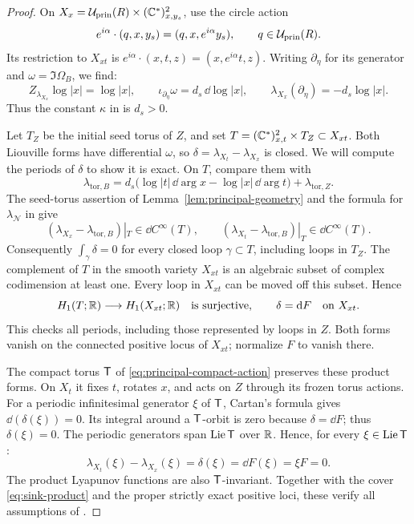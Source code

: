 \documentclass[12pt, letter]{amsart}
\theoremstyle{definition}
\newcommand{\Nn}{\mathcal N}
\newcommand{\pr}{\mathrm{prin}}
\numberwithin{equation}{section}
\begin{document}
\begin{proof}
On $X_x=\cU_{\pr}(R)\times(\C^*)^2_{x,y_s}$, use the circle action
\[
 e^{i\alpha}\cdot(q,x,y_s)=(q,x,e^{i\alpha}y_s),
 \qquad q\in\cU_{\pr}(R).
\]
Its restriction to $X_{xt}$ is
$e^{i\alpha}\cdot(x,t,z)=(x,e^{i\alpha}t,z)$.
Writing $\partial_\eta$ for its generator and
$\omega=\Im\Omega_B$, we find:
\[
 Z_{\lambda_{X_x}}\log|x|=\log|x|,\qquad
 \iota_{\partial_\eta}\omega=d_s\,\dd\log|x|,\qquad
 \lambda_{X_x}(\partial_\eta)=-d_s\log|x|.
\]
Thus the constant $\kappa$ in \cite[Setup~4.8]{HS} is $d_s>0$.



Let $T_Z$ be the initial seed torus of $Z$, and set
$T=(\mathbb C^*)^2_{x,t}\times T_Z\subset X_{xt}$.
Both Liouville forms have differential $\omega$, so
$\delta=\lambda_{X_t}-\lambda_{X_x}$ is closed.  We will compute the periods of $\delta$ to show it is exact.
On $T$, compare them with
\[
 \lambda_{\mathrm{tor},B}
 =d_s\bigl(\log|t|\,\dd\arg x-\log|x|\,\dd\arg t\bigr)
       +\lambda_{\mathrm{tor},Z}.
\] 
The seed-torus assertion of Lemma~\ref{lem:principal-geometry}
and the formula for $\lambda_{\Nn}$ in \cite[Section~4.2]{HS}
give
\[
 (\lambda_{X_x}-\lambda_{\mathrm{tor},B})|_T\in\dd C^\infty(T),
 \qquad
 (\lambda_{X_t}-\lambda_{\mathrm{tor},B})|_T\in\dd C^\infty(T).
\]
Consequently $\int_\gamma\delta=0$ for every closed loop
$\gamma\subset T$, including loops in $T_Z$.
The complement of $T$ in the smooth variety $X_{xt}$ is an
algebraic subset of complex codimension at least one.
Every loop in $X_{xt}$ can be moved off this
subset. Hence
\[
 H_1(T;\mathbb R)\longrightarrow H_1(X_{xt};\mathbb R)
 \quad\text{is surjective},\qquad
 \delta=\mathrm{d} F\quad\text{on }X_{xt}.
\]
This checks all periods, including those represented by loops in $Z$.
Both forms vanish on the connected positive locus of $X_{xt}$;
normalize $F$ to vanish there.

The compact torus $\mathsf T$ of \eqref{eq:principal-compact-action}
preserves these product forms. On $X_t$ it fixes $t$, rotates
$x$, and acts on $Z$ through its frozen torus actions.
For a periodic infinitesimal generator $\xi$ of $\mathsf T$,
Cartan's formula gives $\dd(\delta(\xi))=0$.
Its integral around a $\mathsf T$-orbit is zero because $\delta=\dd F$;
thus $\delta(\xi)=0$.
The periodic generators span $\operatorname{Lie}\mathsf T$ over $\mathbb R$.
Hence, for every $\xi\in\operatorname{Lie}\mathsf T$:
\[
 \lambda_{X_t}(\xi)-\lambda_{X_x}(\xi)
 =\delta(\xi)=\dd F(\xi)=\xi F=0.
\]
The product Lyapunov functions are also $\mathsf T$-invariant.
Together with the cover \eqref{eq:sink-product} and the proper
strictly exact positive loci, these verify all assumptions of
\cite[Setup~4.8]{HS}.


\end{proof}
\end{document}
